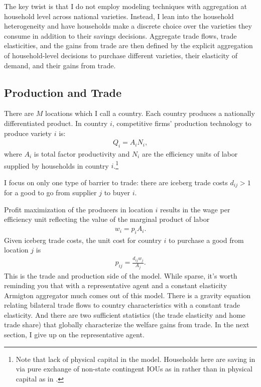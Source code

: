 \documentclass[12pt,pdftex]{article}
\begin{document}
\begin{onehalfspacing}
The key twist is that I do not employ modeling techniques with aggregation at household level across national varieties. Instead, I lean into the household heterogeneity and have households make a discrete choice over the varieties they consume in addition to their savings decisions. Aggregate trade flows, trade elasticities, and the gains from trade are then defined by the explicit aggregation of household-level decisions to purchase different varieties, their elasticity of demand, and their gains from trade.

\subsection{Production and Trade}\label{sec:trade}

There are $M$ locations which I call a country. Each country produces a nationally differentiated product. In country $i$, competitive firms' production technology to produce variety $i$ is:
\begin{align}
Q_i = A_i N_i,
\label{eq:production}
\end{align}
where $A_i$ is total factor productivity and $N_i$ are the efficiency units of labor supplied by households in country $i$.\footnote{Note that lack of physical capital in the model. Households here are saving in via pure exchange of non-state contingent IOUs as in \citet{huggett1993risk} rather than in physical capital as in \citet{aiyagari1994uninsured}.}

I focus on only one type of barrier to trade: there are iceberg trade costs $d_{ij} > 1$ for a good to go from supplier $j$ to buyer $i$.

Profit maximization of the producers in location $i$ results in the wage per efficiency unit reflecting the value of the marginal product of labor
\begin{align}
w_{i} = p_{i} A_{i}.
\label{eq:marginal-product}
\end{align}
Given iceberg trade costs, the unit cost for country $i$ to purchase a good from location $j$ is
\begin{align}
p_{ij} = \frac{d_{ij}w_{j}}{A_{j}}.
\label{eq:marginal-product-ship}
\end{align}
This is the trade and production side of the model. While sparse, it's worth reminding you that with a representative agent and a constant elasticity Armigton aggregator much comes out of this model. There is a gravity equation relating bilateral trade flows to country characteristics with a constant trade elasticity. And there are two sufficient statistics (the trade elasticity and home trade share) that globally characterize the welfare gains from trade. In the next section, I give up on the representative agent.


\end{onehalfspacing}
\end{document}
